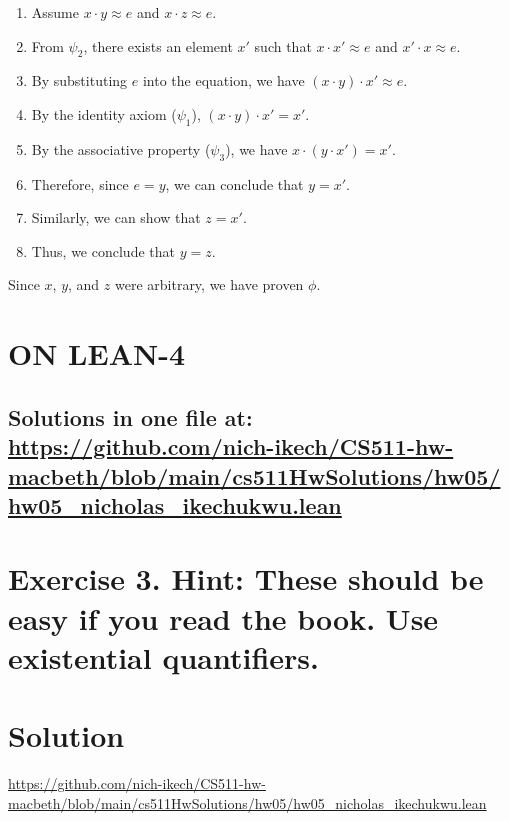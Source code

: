 \documentclass{article}
\newenvironment{proof}
{\begin{mdframed}[linewidth=0.5pt]\begin{enumerate}[label=\arabic*.,leftmargin=*]}
{\end{enumerate}\end{mdframed}}
\begin{document}
\begin{proof}

    \item Assume $x \cdot y \approx e$ and $x \cdot z \approx e$.
    \item From $\psi_2$, there exists an element $x'$ such that $x \cdot x' \approx e$ and $x' \cdot x \approx e$.
    \item By substituting $e$ into the equation, we have $(x \cdot y) \cdot x' \approx e$.
    \item By the identity axiom ($\psi_1$), $(x \cdot y) \cdot x' = x'$.
    \item By the associative property ($\psi_3$), we have $x \cdot (y \cdot x') = x'$.
    \item Therefore, since $e = y$, we can conclude that $y = x'$.
    \item Similarly, we can show that $z = x'$.
    \item Thus, we conclude that $y = z$.

\end{proof}
Since $x$, $y$, and $z$ were arbitrary, we have proven $\phi$.


\newpage







\section*{ON LEAN-4}
\subsection*{Solutions in one file at: 
\url{https://github.com/nich-ikech/CS511-hw-macbeth/blob/main/cs511HwSolutions/hw05/hw05_nicholas_ikechukwu.lean}}

\newpage

\section*{Exercise 3. Hint: These should be easy if you read the book. Use existential quantifiers.}
\section*{Solution}
\url{https://github.com/nich-ikech/CS511-hw-macbeth/blob/main/cs511HwSolutions/hw05/hw05_nicholas_ikechukwu.lean}

\newpage
\end{document}
